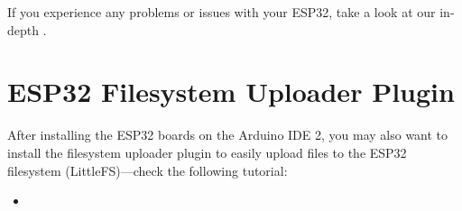 If you experience any problems or issues with your ESP32, take a look at our in-depth .

\section{ESP32 Filesystem Uploader Plugin}

After installing the ESP32 boards on the Arduino IDE 2, you may also want to install the filesystem uploader plugin to easily upload files to the ESP32 filesystem (LittleFS)—check the following tutorial:

  \begin{itemize}
    \item {}
  \end{itemize}
    